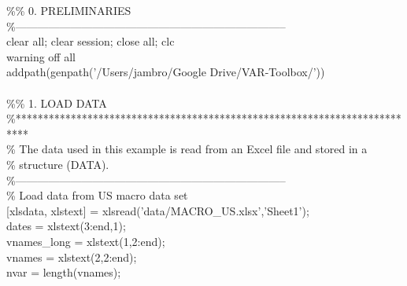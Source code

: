 \hspace{1mm}\textcolor{matlabgreen}{\%}\textcolor{matlabgreen}{\% 0. PRELIMINARIES }\\ 
\hspace{1mm}\textcolor{matlabgreen}{\%--------------------------------------------------------------------------  }\\ 
\hspace{1mm}clear all; clear session; close all; clc \\ 
\hspace{1mm}warning off all \\ 
\hspace{1mm}addpath(genpath(\textcolor{matlabpurple}{'/Users/jambro/Google Drive/VAR-Toolbox/'})) \\ 
\hspace{1mm} \\ 
\hspace{1mm}\textcolor{matlabgreen}{\%}\textcolor{matlabgreen}{\% 1. LOAD DATA }\\ 
\hspace{1mm}\textcolor{matlabgreen}{\%**************************************************************************  }\\ 
\hspace{1mm}\textcolor{matlabgreen}{\% The data used in this example is read from an Excel file and stored in a }\\ 
\hspace{1mm}\textcolor{matlabgreen}{\% structure (DATA). }\\ 
\hspace{1mm}\textcolor{matlabgreen}{\%--------------------------------------------------------------------------  }\\ 
\hspace{1mm}\textcolor{matlabgreen}{\% Load data from US macro data set }\\ 
\hspace{1mm}[xlsdata, xlstext] = xlsread(\textcolor{matlabpurple}{'data/MACRO\_US.xlsx'},\textcolor{matlabpurple}{'Sheet1'}); \\ 
\hspace{1mm}dates = xlstext(3:end,1); \\ 
\hspace{1mm}vnames\_long = xlstext(1,2:end); \\ 
\hspace{1mm}vnames = xlstext(2,2:end); \\ 
\hspace{1mm}nvar = length(vnames); \\ 

